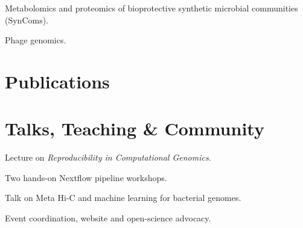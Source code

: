 \documentclass[]{deedy-resume-openfont}
\newcommand{\entrysep}{\vspace{6pt}}
\begin{document}
\begin{tightemize}
\item Metabolomics and proteomics of bioprotective synthetic microbial communities (SynComs).
\item Phage genomics.
\end{tightemize}


\section{Publications}
{\footnotesize
\PubCry{}\par\vspace{3pt}
\PubAjp{}\par\vspace{3pt}
\PubHep{}\par
}


\section{Talks, Teaching \& Community}

\begin{tightemize}
\item Lecture on \textit{Reproducibility in Computational Genomics}.
\item Two hands-on Nextflow pipeline workshops.
\item Talk on Meta Hi-C and machine learning for bacterial genomes.
\end{tightemize}
\entrysep

\begin{tightemize}
\item Event coordination, website and open-science advocacy.
\end{tightemize}

\end{document}
